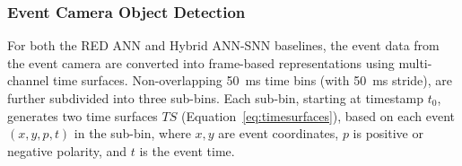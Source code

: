 




\subsubsection*{Event Camera Object Detection}
For both the RED ANN and Hybrid ANN-SNN baselines, the event data from the event camera are converted into frame-based representations using multi-channel time surfaces. Non-overlapping 50~ms time bins (with 50~ms stride), are further subdivided into three sub-bins. Each sub-bin, starting at timestamp $t_0$, generates two time surfaces $TS$ (Equation~\ref{eq:timesurfaces}), based on each event $(x, y, p, t)$ in the sub-bin, where $x, y$ are event coordinates, $p$ is positive or negative polarity, and $t$ is the event time.

